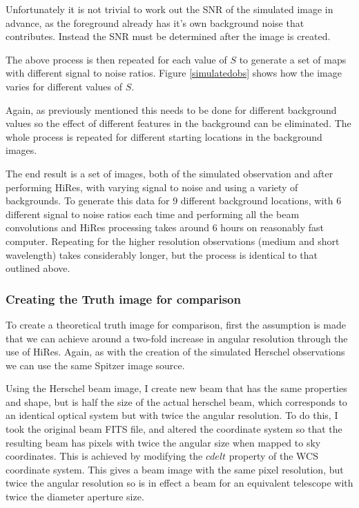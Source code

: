 Unfortunately it is not trivial to work out the SNR of the simulated image in advance, as the foreground already has it's own background noise that contributes. Instead the SNR must be determined after the image is created.

The above process is then repeated for each value of $S$ to generate a set of maps with different signal to noise ratios. Figure \ref{simulatedobs} shows how the image varies for different values of $S$.

Again, as previously mentioned this needs to be done for different background values so the effect of different features in the background can be eliminated. The whole process is repeated for different starting locations in the background images.

The end result is a set of images, both of the simulated observation and after performing HiRes, with varying signal to noise and using a variety of backgrounds. To generate this data for 9 different background locations, with 6 different signal to noise ratios each time and performing all the beam convolutions and HiRes processing takes around 6 hours on reasonably fast computer. Repeating for the higher resolution observations (medium and short wavelength) takes considerably longer, but the process is identical to that outlined above.

\subsubsection{Creating the Truth image for comparison}

To create a theoretical truth image for comparison, first the assumption is made that we can achieve around a two-fold increase in angular resolution through the use of HiRes. Again, as with the creation of the simulated Herschel observations we can use the same Spitzer image source.

Using the Herschel beam image, I create new beam that has the same properties and shape, but is half the size of the actual herschel beam, which corresponds to an identical optical system but with twice the angular resolution. To do this, I took the original beam FITS file, and altered the coordinate system so that the resulting beam has pixels with twice the angular size when mapped to sky coordinates. This is achieved by modifying the $cdelt$ property of the WCS coordinate system. This gives a beam image with the same pixel resolution, but twice the angular resolution so is in effect a beam for an equivalent telescope with twice the diameter aperture size.

